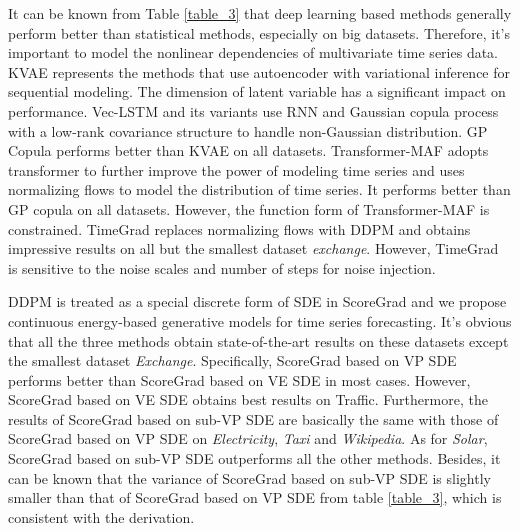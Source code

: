 It can be known from Table \ref{table_3} that deep learning based methods generally perform better than statistical methods, especially on big datasets. Therefore, it's important to model the nonlinear dependencies of multivariate time series data. KVAE represents the methods that use autoencoder with variational inference for sequential modeling. The dimension of latent variable has a significant impact on performance. Vec-LSTM and its variants use RNN and Gaussian copula process with a low-rank covariance structure to handle non-Gaussian distribution. GP Copula performs better than KVAE on all datasets. Transformer-MAF adopts transformer to further improve the power of modeling time series and uses normalizing flows to model the distribution of time series. It performs better than GP copula on all datasets. However, the function form of Transformer-MAF is constrained. TimeGrad replaces normalizing flows with DDPM and obtains impressive results on all but the smallest dataset \textit{exchange}. However, TimeGrad is sensitive to the noise scales and number of steps for noise injection. %

DDPM is treated as a special discrete form of SDE in ScoreGrad and we propose continuous energy-based generative models for time series forecasting. It's obvious that all the three methods obtain state-of-the-art results on these datasets except the smallest dataset \textit{Exchange}. Specifically, ScoreGrad based on VP SDE performs better than ScoreGrad based on VE SDE in most cases. However, ScoreGrad based on VE SDE obtains best results on Traffic. Furthermore, the results of ScoreGrad based on sub-VP SDE are basically the same with those of ScoreGrad based on VP SDE on \textit{Electricity}, \textit{Taxi} and \textit{Wikipedia}. As for \textit{Solar}, ScoreGrad based on sub-VP SDE outperforms all the other methods. Besides, it can be known that the variance of ScoreGrad based on sub-VP SDE is slightly smaller than that of ScoreGrad based on VP SDE from table \ref{table_3}, which is consistent with the derivation.

